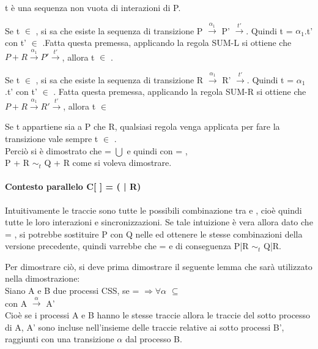 t è una sequenza non vuota di interazioni di P.

Se t $\in$ , si sa che esiste la sequenza di transizione P $\overset{\alpha_{1}}\rightarrow$ P' $\overset{t'}\rightarrow$. Quindi t = $\alpha_{1}$.t' con t' $\in$ .Fatta questa premessa, applicando la regola SUM-L si ottiene che $P + R \overset{\alpha_{1}}\rightarrow P'\overset{t'}\rightarrow$, allora t $\in$ .

Se t $\in$ , si sa che esiste la sequenza di transizione R $\overset{\alpha_{1}}\rightarrow$ R' $\overset{t'}\rightarrow$. Quindi t = $\alpha_{1}$.t' con t' $\in$ . Fatta questa premessa, applicando la regola SUM-R si ottiene che $P + R \overset{\alpha_{1}}\rightarrow R'\overset{t'}\rightarrow$, allora t $\in$ 

Se t appartiene sia a P che R, qualsiasi regola venga applicata per fare la transizione vale sempre t $\in$ .\\

Perciò si è dimostrato che  =  $\bigcup$  e quindi con  = ,\\ P + R $\sim_{t}$ Q + R come si voleva dimostrare.

\paragraph{Contesto parallelo  C[ ] = (\hspace{0.3cm} | R)} \mbox{}

Intuitivamente le traccie  sono tutte le possibili combinazione tra  e , cioè quindi tutte le loro interazioni e sincronizzazioni. Se tale intuizione è vera allora dato che  = , si potrebbe sostituire P con Q nelle  ed ottenere le stesse combinazioni della versione precedente, quindi varrebbe che  =  e di conseguenza P|R $\sim_{t}$ Q|R.

Per dimostrare ciò, si deve prima dimostrare il seguente lemma che sarà utilizzato nella dimostrazione:\\
Siano A e B due processi CSS, se  =  $\Rightarrow \forall\alpha$ $\subseteq$ \\con A $ \overset{\alpha}\rightarrow $ A'\\
Cioè se i processi A e B hanno le stesse traccie allora le traccie del sotto processo di A, A' sono incluse nell'insieme delle traccie relative ai sotto processi B', raggiunti con una transizione $\alpha$ dal processo B.\\

